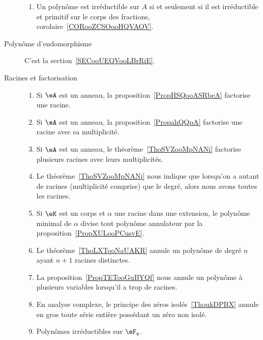 \begin{description}
		\begin{enumerate}
			\item
			      Un polynôme est irréductible sur \( A\) si et seulement si il est irréductible et primitif sur le corps des fractions, corolaire~\ref{CORooZCSOooHQVAOV}.
		\end{enumerate}

	\item[Polynôme d'endomorphisme]
		C'est la section~\ref{SECooUEQVooLBrRiE}.

	\item[Racines et factorisation]

		\begin{enumerate}
			\item
			      Si \( \eA\) est un anneau, la proposition~\ref{PropHSQooASRbeA} factorise une racine.
			\item
			      Si \( \eA\) est un anneau, la proposition~\ref{PropahQQpA} factorise une racine avec sa multiplicité.
			\item
			      Si \( \eA\) est un anneau, le théorème~\ref{ThoSVZooMpNANi} factorise plusieurs racines avec leurs multiplicités.
			\item
			      Le théorème~\ref{ThoSVZooMpNANi} nous indique que lorsqu'on a autant de racines (multiplicité comprise) que le degré, alors nous avons toutes les racines.
			\item
			      Si \( \eK\) est un corps et \( \alpha\) une racine dans une extension, le polynôme minimal de \( \alpha\) divise tout polynôme annulateur par la proposition~\ref{PropXULooPCusvE}.
			\item
			      Le théorème~\ref{ThoLXTooNaUAKR} annule un polynôme de degré \( n\) ayant \( n+1\) racines distinctes.
			\item
			      La proposition~\ref{PropTETooGuBYQf} nous annule un polynôme à plusieurs variables lorsqu'il a trop de racines.
			\item
			      En analyse complexe, le principe des zéros isolés~\ref{ThoukDPBX} annule en gros toute série entière possédant un zéro non isolé.
			\item
			      Polynômes irréductibles sur \( \eF_q\).
		\end{enumerate}

\end{description}
